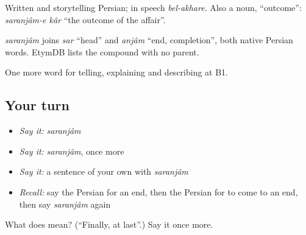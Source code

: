Written and storytelling Persian; in speech \emph{bel-akhare}. Also a noun, \textquotedblleft{}outcome\textquotedblright{}: \emph{saranjâm-e kâr} \textquotedblleft{}the outcome of the affair\textquotedblright{}.

\begin{cousinweb}
\emph{saranjâm} joins \emph{sar} \textquotedblleft{}head\textquotedblright{} and \emph{anjâm} \textquotedblleft{}end, completion\textquotedblright{}, both native Persian words. EtymDB lists the compound with no parent.
\end{cousinweb}

\begin{grammarlens}[title={What you've built}]
One more word for telling, explaining and describing at B1.
\end{grammarlens}

\subsection*{Your turn}
\begin{itemize}
\raggedright
  \item \emph{Say it:} \emph{saranjâm}
  \item \emph{Say it:} \emph{saranjâm}, once more
  \item \emph{Say it:} a sentence of your own with \emph{saranjâm}
  \item \emph{Recall:} say the Persian for an end, then the Persian for to come to an end, then say \emph{saranjâm} again
\end{itemize}

\begin{tcolorbox}[breakable,colback=teal!4,colframe=teal!35!black,title={Before you move on}]
What does  mean? (\textquotedblleft{}Finally, at last\textquotedblright{}.) Say it once more.
\end{tcolorbox}
